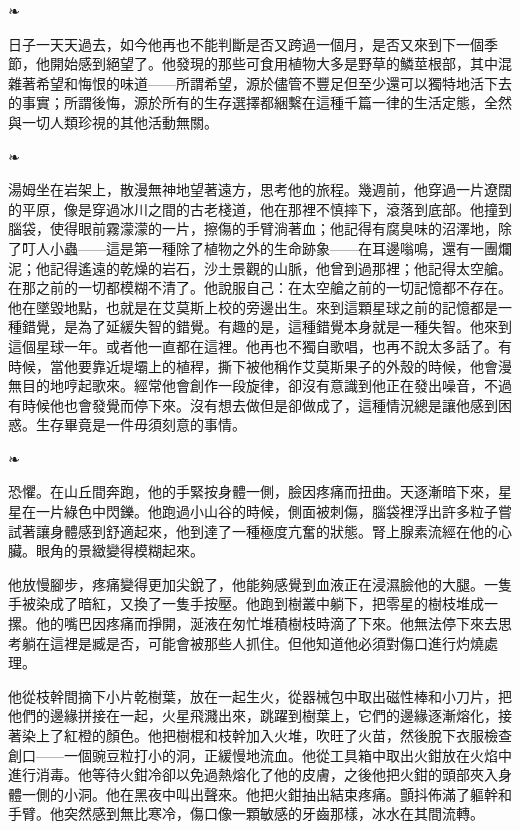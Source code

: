 \documentclass[10pt]{article}
\begin{document}
\begin{center}❧\end{center}

日子一天天過去，如今他再也不能判斷是否又跨過一個月，是否又來到下一個季節，他開始感到絕望了。他發現的那些可食用植物大多是野草的鱗莖根部，其中混雜著希望和悔恨的味道——所謂希望，源於儘管不豐足但至少還可以獨特地活下去的事實；所謂後悔，源於所有的生存選擇都綑繫在這種千篇一律的生活定態，全然與一切人類珍視的其他活動無關。

\begin{center}❧\end{center}

湯姆坐在岩架上，散漫無神地望著遠方，思考他的旅程。幾週前，他穿過一片遼闊的平原，像是穿過冰川之間的古老棧道，他在那裡不慎摔下，滾落到底部。他撞到腦袋，使得眼前霧濛濛的一片，擦傷的手臂淌著血；他記得有腐臭味的沼澤地，除了叮人小蟲——這是第一種除了植物之外的生命跡象——在耳邊嗡鳴，還有一團爛泥；他記得遙遠的乾燥的岩石，沙土景觀的山脈，他曾到過那裡；他記得太空艙。在那之前的一切都模糊不清了。他說服自己：在太空艙之前的一切記憶都不存在。他在墜毀地點，也就是在艾莫斯上校的旁邊出生。來到這顆星球之前的記憶都是一種錯覺，是為了延緩失智的錯覺。有趣的是，這種錯覺本身就是一種失智。他來到這個星球一年。或者他一直都在這裡。他再也不獨自歌唱，也再不說太多話了。有時候，當他要靠近堤壩上的植稈，撕下被他稱作艾莫斯果子的外殼的時候，他會漫無目的地哼起歌來。經常他會創作一段旋律，卻沒有意識到他正在發出噪音，不過有時候他也會發覺而停下來。沒有想去做但是卻做成了，這種情況總是讓他感到困惑。生存畢竟是一件毋須刻意的事情。

\begin{center}❧\end{center}

恐懼。在山丘間奔跑，他的手緊按身體一側，臉因疼痛而扭曲。天逐漸暗下來，星星在一片綠色中閃鑠。他跑過小山谷的時候，側面被刺傷，腦袋裡浮出許多粒子嘗試著讓身體感到舒適起來，他到達了一種極度亢奮的狀態。腎上腺素流經在他的心臟。眼角的景緻變得模糊起來。

他放慢腳步，疼痛變得更加尖銳了，他能夠感覺到血液正在浸濕臉他的大腿。一隻手被染成了暗紅，又換了一隻手按壓。他跑到樹叢中躺下，把零星的樹枝堆成一摞。他的嘴巴因疼痛而掙開，涎液在匆忙堆積樹枝時滴了下來。他無法停下來去思考躺在這裡是臧是否，可能會被那些人抓住。但他知道他必須對傷口進行灼燒處理。

他從枝幹間摘下小片乾樹葉，放在一起生火，從器械包中取出磁性棒和小刀片，把他們的邊緣拼接在一起，火星飛濺出來，跳躍到樹葉上，它們的邊緣逐漸熔化，接著染上了紅橙的顏色。他把樹棍和枝幹加入火堆，吹旺了火苗，然後脫下衣服檢查創口——一個豌豆粒打小的洞，正緩慢地流血。他從工具箱中取出火鉗放在火焰中進行消毒。他等待火鉗冷卻以免過熱熔化了他的皮膚，之後他把火鉗的頭部夾入身體一側的小洞。他在黑夜中叫出聲來。他把火鉗抽出結束疼痛。顫抖佈滿了軀幹和手臂。他突然感到無比寒冷，傷口像一顆敏感的牙齒那樣，冰水在其間流轉。
\end{document}
